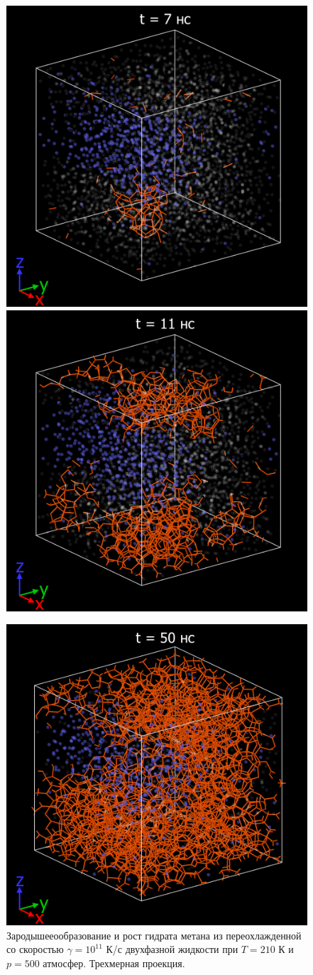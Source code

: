 \begin{figure}[H]
    \centering
    \begin{minipage}{\linewidth}
        \centering
        \includegraphics[width=.4\linewidth]{figures/nuclei7.png}
        \includegraphics[width=.4\linewidth]{figures/nuclei8.png}
    \end{minipage}
    \begin{minipage}{\linewidth}
        \centering
        \includegraphics[width=.4\linewidth]{figures/nuclei9.png}
    \end{minipage}
    \caption{Зародышееообразование и рост гидрата метана из переохлажденной со скоростью $\gamma=10^{11}$ К/с двухфазной жидкости при $T=210$ К и $p=500$ атмосфер. Трехмерная проекция.}
    \label{fig3.6}
\end{figure}

